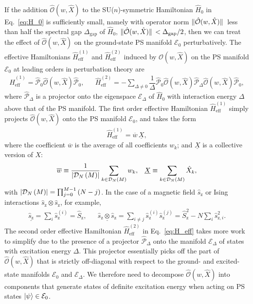 \documentclass[aps,pra,nofootinbib,twocolumn,superscriptaddress]{revtex4-2}
\renewcommand{\t}{\text} %
\newcommand{\f}[2]{\dfrac{#1}{#2}} %
\newcommand{\p}[1]{\left(#1\right)} %
\newcommand{\1}{\mathds{1}}
\newcommand{\s}{\hat{s}}
\renewcommand{\H}{\hat{H}}
\renewcommand{\S}{\hat{S}}
\renewcommand{\O}{\hat{\mathcal{O}}}
\renewcommand{\P}{\hat{\mathcal{P}}}
\newcommand{\z}{\text{z}}
\newcommand{\D}{\mathcal{D}}
\newcommand{\E}{\mathcal{E}}
\newcommand{\eff}{\text{eff}}
\newcommand{\col}{\underline}
\newcommand{\mean}{\overline}
\begin{document}
If the addition $\O(w,\hat{X})$ to the SU($n$)-symmetric Hamiltonian $\H_0$ in Eq.~\eqref{eq:H_0} is sufficiently small, namely with operator norm $\norm*{\O(w,\hat{X})}$ less than half the spectral gap $\Delta_{\t{gap}}$ of $\H_0$, $\norm*{\O(w,\hat{X})}<\Delta_{\t{gap}}/2$, then we can treat the effect of $\O(w,\hat{X})$ on the ground-state PS manifold $\E_0$ perturbatively.
The effective Hamiltonians $\H_\eff^{(1)}$ and $\H_\eff^{(2)}$ induced by $\O(w,\hat{X})$ on the PS manifold $\E_0$ at leading orders in perturbation theory are \cite{bravyi2011schrieffer}
\begin{align}
  \H_\eff^{(1)} = \P_0 \O(w,\hat{X}) \P_0,
  &&
  \H_\eff^{(2)} = - \sum_{\Delta\ne0}
  \f1\Delta \P_0 \O(w,\hat{X}) \P_\Delta \O(w,\hat{X}) \P_0,
  \label{eq:H_eff}
\end{align}
where $\P_\Delta$ is a projector onto the eigenspace $\E_\Delta$ of $\H_0$ with interaction energy $\Delta$ above that of the PS manifold.
The first order effective Hamiltonian $\H_\eff^{(1)}$ simply projects $\O(w,\hat{X})$ onto the PS manifold $\E_0$, and takes the form
\begin{align}
  \H_\eff^{(1)} = \mean w \, \col X,
  \label{eq:H_eff_1}
\end{align}
where the coefficient $\mean w$ is the average of all coefficients $w_k$; and $\col X$ is a collective version of $X$:
\begin{align}
  \mean w \equiv \f1{\abs{\D_N\p{M}}}
  \sum_{k\in\D_N\p{M}} w_k,
  &&
  \col X \equiv \sum_{k\in\D_N\p{M}} \hat{X}_k,
  \label{eq:mean_col}
\end{align}
with $\abs{\D_N\p{M}}=\prod_{j=0}^{M-1}\p{N-j}$.
In the case of a magnetic field $\s_\z$ or Ising interactions  $\s_\z\otimes \s_\z$, for example,
\begin{align}
  \col{\s_\z} = \sum_i \s_\z^{(i)} = \S_\z,
  &&
  \col{\s_\z\otimes \s_\z}
  = \sum_{i\ne j} \s_\z^{(i)} \s_\z^{(j)}
  = \S_\z^2 - N \sum_i \s_{\z,i}^2.
\end{align}
The second order effective Hamiltonian $\H_\eff^{(2)}$ in Eq.~\eqref{eq:H_eff} takes more work to simplify due to the presence of a projector $\P_\Delta$ onto the manifold $\E_\Delta$ of states with excitation energy $\Delta$.
This projector essentially picks off the part of $\O(w,\hat{X})$ that is strictly off-diagonal with respect to the ground- and excited-state manifolds $\E_0$ and $\E_\Delta$.
We therefore need to decompose $\O(w,\hat{X})$ into components that generate states of definite excitation energy when acting on PS states $\ket\psi\in\E_0$.
\end{document}
